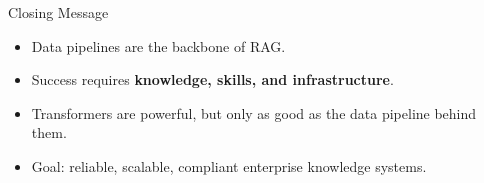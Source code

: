 \documentclass{beamer}
\begin{document}

\begin{frame}{Closing Message}
\begin{itemize}
    \item Data pipelines are the backbone of RAG.
    \item Success requires \textbf{knowledge, skills, and infrastructure}.
    \item Transformers are powerful, but only as good as the data pipeline behind them.
    \item Goal: reliable, scalable, compliant enterprise knowledge systems.
\end{itemize}
\end{frame}

\end{document}
